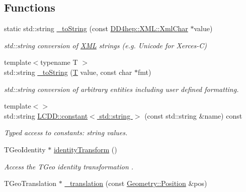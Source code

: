 \subsection*{Functions}
\begin{DoxyCompactItemize}
\item 
static std\+::string \hyperlink{namespace_d_d4hep_1_1_geometry_abb6544cdd599b803023143aefeec44d7}{\+\_\+to\+String} (const \hyperlink{namespace_d_d4hep_1_1_x_m_l_a09e5d9cc86ed782f6826dfe0778c1815}{D\+D4hep\+::\+X\+M\+L\+::\+Xml\+Char} $\ast$value)
\begin{DoxyCompactList}\small\item\em std\+::string conversion of \hyperlink{namespace_d_d4hep_1_1_x_m_l}{X\+ML} strings (e.\+g. Unicode for Xerces-\/C) \end{DoxyCompactList}\item 
{\footnotesize template$<$typename T $>$ }\\std\+::string \hyperlink{namespace_d_d4hep_1_1_geometry_ae801055912eef2181cab32b9701707f7}{\+\_\+to\+String} (\hyperlink{class_t}{T} value, const char $\ast$fmt)
\begin{DoxyCompactList}\small\item\em std\+::string conversion of arbitrary entities including user defined formatting. \end{DoxyCompactList}\item 
{\footnotesize template$<$$>$ }\\std\+::string \hyperlink{namespace_d_d4hep_1_1_geometry_a3ac075bf7e59ffbf2a572a3df4f60c8e}{L\+C\+D\+D\+::constant$<$ std\+::string $>$} (const std\+::string \&name) const
\begin{DoxyCompactList}\small\item\em Typed access to constants\+: string values. \end{DoxyCompactList}\item 
T\+Geo\+Identity $\ast$ \hyperlink{group___d_d4_h_e_p___g_e_o_m_e_t_r_y_gacb7266110e19d4dda6cc6b2ebc57bd39}{identity\+Transform} ()
\begin{DoxyCompactList}\small\item\em Access the T\+Geo identity transformation . \end{DoxyCompactList}\item 
T\+Geo\+Translation $\ast$ \hyperlink{group___d_d4_h_e_p___g_e_o_m_e_t_r_y_ga2a9c214ef0a2444cccf194669fe81771}{\+\_\+translation} (const \hyperlink{namespace_d_d4hep_1_1_geometry_a55083902099d03506c6db01b80404900}{Geometry\+::\+Position} \&pos)

\end{DoxyCompactItemize}
